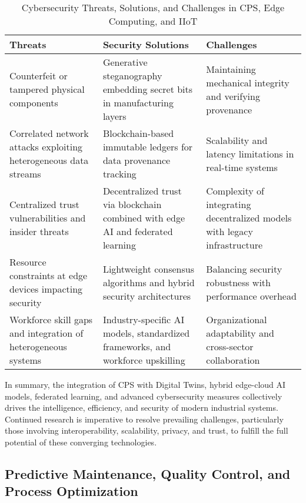 \documentclass[sigconf]{acmart}
\begin{document}
\begin{table*}[htbp]
\centering
\caption{Cybersecurity Threats, Solutions, and Challenges in CPS, Edge Computing, and IIoT}
\label{tab:cybersecurity_summary}
\begin{adjustbox}{max width=\textwidth}
\begin{tabular}{@{}lll@{}}
\toprule
\textbf{Threats} & \textbf{Security Solutions} & \textbf{Challenges} \\ \midrule
Counterfeit or tampered physical components & Generative steganography embedding secret bits in manufacturing layers~\cite{ref9,ref13} & Maintaining mechanical integrity and verifying provenance \\
Correlated network attacks exploiting heterogeneous data streams & Blockchain-based immutable ledgers for data provenance tracking~\cite{ref20} & Scalability and latency limitations in real-time systems \\
Centralized trust vulnerabilities and insider threats & Decentralized trust via blockchain combined with edge AI and federated learning~\cite{ref22} & Complexity of integrating decentralized models with legacy infrastructure \\
Resource constraints at edge devices impacting security & Lightweight consensus algorithms and hybrid security architectures~\cite{ref31} & Balancing security robustness with performance overhead \\
Workforce skill gaps and integration of heterogeneous systems & Industry-specific AI models, standardized frameworks, and workforce upskilling~\cite{ref32} & Organizational adaptability and cross-sector collaboration \\ \bottomrule
\end{tabular}
\end{adjustbox}
\end{table*}

\bigskip

\noindent In summary, the integration of CPS with Digital Twins, hybrid edge-cloud AI models, federated learning, and advanced cybersecurity measures collectively drives the intelligence, efficiency, and security of modern industrial systems. Continued research is imperative to resolve prevailing challenges, particularly those involving interoperability, scalability, privacy, and trust, to fulfill the full potential of these converging technologies.

\subsection{Predictive Maintenance, Quality Control, and Process Optimization}
\end{document}
